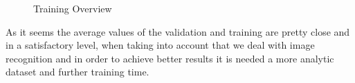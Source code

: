 \begin{figure}[H]
  \centering
  \hfill
  \caption{Training Overview}
\end{figure}

As it seems the average values of the validation and training are pretty close and in a satisfactory level, when taking into account that we deal with image recognition and in order to achieve better results it is needed a more analytic dataset and further training time.
